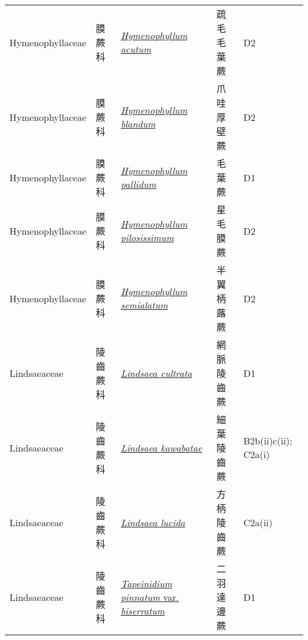 {\begin{longtable}{L{2.5cm}L{2cm}L{5cm}L{2.5cm}L{3cm}}
    Hymenophyllaceae & 膜蕨科 & \href{http://www.theplantlist.org/tpl1.1/search?q=Hymenophyllum+acutum}{\textit{Hymenophyllum acutum} } & 疏毛毛葉蕨 & D2    \\
    Hymenophyllaceae & 膜蕨科 & \href{http://www.theplantlist.org/tpl1.1/search?q=Hymenophyllum+blandum}{\textit{Hymenophyllum blandum} } & 爪哇厚壁蕨 & D2    \\
    Hymenophyllaceae & 膜蕨科 & \href{http://www.theplantlist.org/tpl1.1/search?q=Hymenophyllum+pallidum}{\textit{Hymenophyllum pallidum} } & 毛葉蕨 & D1    \\
    Hymenophyllaceae & 膜蕨科 & \href{http://www.theplantlist.org/tpl1.1/search?q=Hymenophyllum+pilosissimum}{\textit{Hymenophyllum pilosissimum} } & 星毛膜蕨 & D2    \\
    Hymenophyllaceae & 膜蕨科 & \href{http://www.theplantlist.org/tpl1.1/search?q=Hymenophyllum+semialatum}{\textit{Hymenophyllum semialatum} } & 半翼柄蕗蕨 & D2    \\
    Lindsaeaceae & 陵齒蕨科 & \href{http://www.theplantlist.org/tpl1.1/search?q=Lindsaea+cultrata}{\textit{Lindsaea cultrata} } & 網脈陵齒蕨 & D1    \\
    Lindsaeaceae & 陵齒蕨科 & \href{http://www.theplantlist.org/tpl1.1/search?q=Lindsaea+kawabatae}{\textit{Lindsaea kawabatae} } & 細葉陵齒蕨 & B2b(ii)c(ii); C2a(i)    \\
    Lindsaeaceae & 陵齒蕨科 & \href{http://www.theplantlist.org/tpl1.1/search?q=Lindsaea+lucida}{\textit{Lindsaea lucida} } & 方柄陵齒蕨 & C2a(ii)    \\
    Lindsaeaceae & 陵齒蕨科 & \href{http://www.theplantlist.org/tpl1.1/search?q=Tapeinidium+pinnatum+var.+biserratum}{\textit{Tapeinidium pinnatum} var. \textit{biserratum} } & 二羽達邊蕨 & D1    \\

\end{longtable}}
